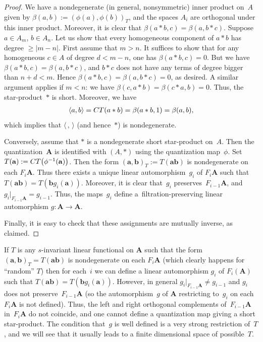 \documentclass[11pt]{article}
\numberwithin{equation}{section}
\numberwithin{equation}{section}
\begin{document}
\begin{proof} We have a nondegenerate (in general, nonsymmetric) inner product on~$A$ given by $\beta(a,b):=(\phi(a),\phi(b))_T$, and the spaces $A_i$ are orthogonal under this inner product. Moreover, it is clear that $\beta(a*b,c)=\beta(a,b*c)$. Suppose $a\in A_m$, $b\in A_n$. Let us show that every homogeneous component of $a*b$ has degree $\ge |m-n|$. First assume that $m>n$. It suffices to show that for any homogeneous $c\in A$ of degree $d<m-n$, one has $\beta(a*b,c)=0$. But we have $\beta(a*b,c)=\beta(a,b*c)$, and $b*c$ does not have any terms of degree bigger than $n+d<m$.
Hence $\beta(a*b,c)=\beta(a,b*c)=0$, as desired. A similar argument applies if $m<n$: we have $\beta(c,a*b)=\beta(c*a,b)=0$. Thus, the star-product~$*$ is short. Moreover, we have
\begin{gather*}
\langle a,b\rangle={\rm CT}(a*b)=\beta(a*b,1)=\beta(a,b),
\end{gather*}
which implies that $\langle\,,\,\rangle$ (and hence~$*$) is nondegenerate.

Conversely, assume that $*$ is a nondegenerate short star-product on~$A$. Then the quantization~${{\mathbf A}}$ is identified with $(A,*)$ using the quantization map~$\phi$. Set $T({\mathbf a}):={\rm CT}\big(\phi^{-1}({\mathbf a})\big)$. Then the form $({\textbf{a}},{\textbf{b}})_T:=T({\textbf{ab}})$ is nondegenerate on each $F_i{{\mathbf A}}$. Thus there exists a unique linear automorphism~$g_i$ of $F_i{{\mathbf A}}$ such that $T({\textbf{ab}})=T({\mathbf b}g_i({\mathbf a}))$. Moreover, it is clear that~$g_i$ preserves~$F_{i-1}{{\mathbf A}}$, and $g_i|_{F_{i-1}{{\mathbf A}}}=g_{i-1}$. Thus, the maps~$g_i$ define a~filtration-preserving linear automorphism $g\colon {{\mathbf A}}\to {{\mathbf A}}$.

Finally, it is easy to check that these assignments are mutually inverse, as claimed.
\end{proof}

\begin{Remark} If $T$ is any $s$-invariant linear functional on ${\mathbf A}$ such that the form $({\mathbf a},{\mathbf b})_T=T({\mathbf a}{\mathbf b})$ is nondegenerate on each $F_i{\mathbf A}$ (which clearly happens for ``random'' $T$) then for each~$i$ we can define a linear automorphism $g_i$ of $F_i({\mathbf A})$ such that $T({\textbf{ab}})=T({\mathbf b}g_i({\mathbf a}))$. However, in general $g_i|_{F_{i-1}{\mathbf A}}\ne g_{i-1}$ and $g_i$ does not preserve~$F_{i-1}{\mathbf A}$ (so the automorphism~$g$ of ${\mathbf A}$ restricting to~$g_i$ on each $F_i{\mathbf A}$ is not defined). Thus, the left and right orthogonal complements of~$F_{i-1}{\mathbf A}$ in~$F_i{\mathbf A}$ do not coincide, and one cannot define a quantization map giving a short star-product. The condition that~$g$ is well defined is a very strong restriction of~$T$, and we will see that it usually leads to a finite dimensional space of possible~$T$.
\end{Remark}
\end{document}
